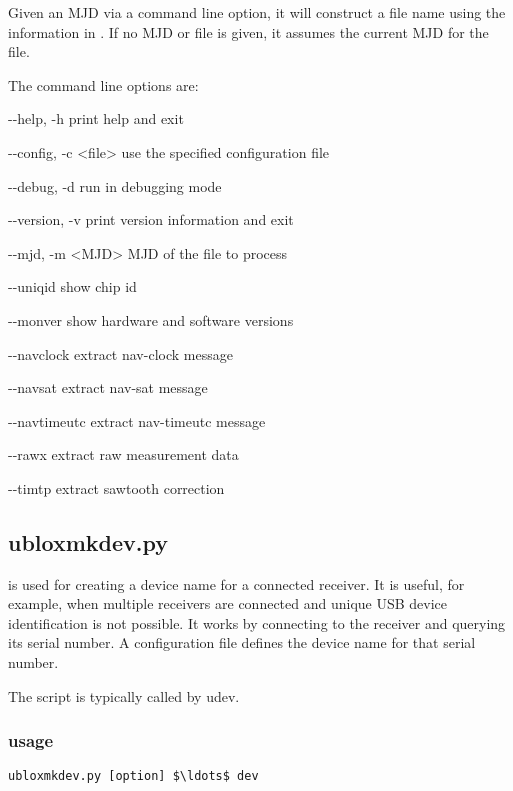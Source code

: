 Given an MJD via a command line option, it will construct a file name using the information in . If no MJD or file is given, it assumes the current MJD for the file. 

The command line options are:
\begin{description*}
	\item[-{}-help, -h] print help and exit
	\item[-{}-config, -c \textless file\textgreater] use the specified configuration file
	\item[-{}-debug, -d] run in debugging mode
	\item[-{}-version, -v] print version information and exit
	\item[-{}-mjd, -m \textless{MJD}\textgreater]  MJD of the file to process
  \item[-{}-uniqid]  show chip id
  \item[-{}-monver]  show hardware and software versions
  \item[-{}-navclock] extract nav-clock message
  \item[-{}-navsat] extract nav-sat message
  \item[-{}-navtimeutc] extract nav-timeutc message
  \item[-{}-rawx] extract raw measurement data
  \item[-{}-timtp] extract sawtooth correction
\end{description*}

\subsection{ubloxmkdev.py} \hypertarget{h:ubloxmkdev}{}

 is used for creating a device name for a connected 
receiver. It is useful, for example, when multiple receivers are connected
and unique USB device identification is not possible. It works by 
connecting to the receiver and querying its serial number. A configuration
file defines the device name for that serial number. 

The script is typically called by udev.

\subsubsection{usage}

\begin{lstlisting}[mathescape=true]
ubloxmkdev.py [option] $\ldots$ dev
\end{lstlisting}

